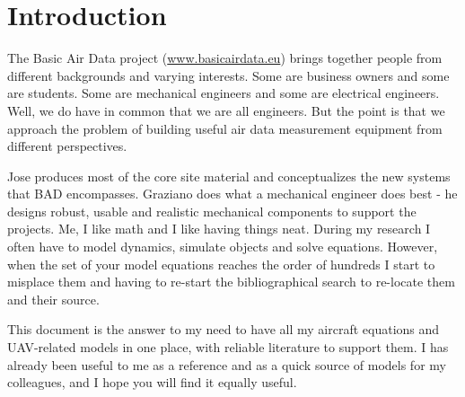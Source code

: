 \chapter{Introduction}

The Basic Air Data project (\url{www.basicairdata.eu}) brings together people from different backgrounds and varying interests. Some are business owners and some are students. Some are mechanical engineers and some are electrical engineers. Well, we do have in common that we are all engineers. But the point is that we approach the problem of building useful air data measurement equipment from different perspectives.

Jose produces most of the core site material and conceptualizes the new systems that BAD encompasses. Graziano does what a mechanical engineer does best - he designs robust, usable and realistic mechanical components to support the projects. Me, I like math and I like having things neat. During my research I often have to model dynamics, simulate objects and solve equations. However, when the set of your model equations reaches the order of hundreds I start to misplace them and having to re-start the bibliographical search to re-locate them and their source.

This document is the answer to my need to have all my aircraft equations and UAV-related models in one place, with reliable literature to support them. I has already been useful to me as a reference and as a quick source of models for my colleagues, and I hope you will find it equally useful.